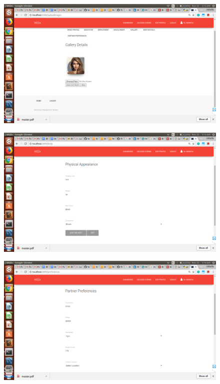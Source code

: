 \documentclass[12pt]{report}
\begin{document}
\begin{figure}[!htb]
    \centering
    \includegraphics[width=1\textwidth]{sc-6.png}
\end{figure}

\begin{figure}[!htb]
    \centering
    \includegraphics[width=1\textwidth]{sc-7.png}
\end{figure}

\begin{figure}[!htb]
    \centering
    \includegraphics[width=1\textwidth]{sc-8.png}
\end{figure}
\end{document}
